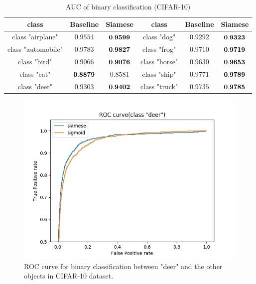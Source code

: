 \documentclass[a4paper,12pt]{article}
\begin{document}
\begin{table}[ht]
\begin{center}
\caption{AUC of binary classification (CIFAR-10)}
\label{table:AUC_CIFAR10_binary}
\begin{tabular}{|c|c|c||c|c|c|} \hline
class & Baseline & Siamese & class &  Baseline & Siamese  \\ \hline \hline
class "airplane" &     $0.9554$    &     ${\bf 0.9599}$          &   class "dog"        &$0.9292$     &  ${\bf 0.9323}$  \\ \hline
class "automobile" & $0.9783$      &    ${\bf 0.9827}$          &  class "frog"          & $0.9710$   &  ${\bf 0.9719}$    \\ \hline
class "bird" &     $0.9066$        & ${\bf 0.9076}$              &  class "horse"          & $0.9630$   & ${\bf 0.9653}$    \\ \hline
class "cat" &        ${\bf 0.8879}$     &    $0.8581$            &     class "ship"      &  $0.9771$      & ${\bf 0.9789}$ \\ \hline
class "deer" &     $0.9303$        &     ${\bf 0.9402}$           &    class "truck"          &  $0.9735$  & ${\bf 0.9785}$    \\ \hline
\end{tabular}
\end{center}
\end{table}


\begin{figure}[ht] 
\centering
\includegraphics[scale=0.5]{roc_curve.png}
\caption{ROC curve for binary classification between "deer" and the other objects in CIFAR-10 dataset.}
\label{fig:roc-bi}
\end{figure}
\clearpage
\end{document}
